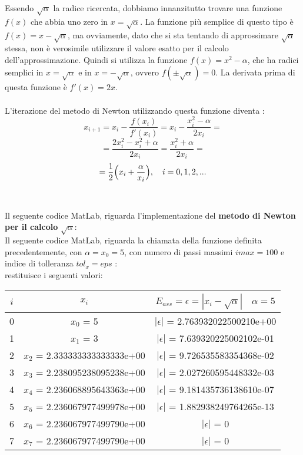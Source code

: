 Essendo $\sqrt{\alpha}$ la radice ricercata, dobbiamo innanzitutto trovare una funzione $f(x)$ che abbia uno zero in $x=\sqrt{\alpha}$. La funzione più semplice di questo tipo è $f(x)=x-\sqrt{\alpha}$, ma ovviamente, dato che si sta tentando di approssimare $\sqrt{\alpha}$ stessa, non è verosimile utilizzare il valore esatto per il calcolo dell'approssimazione. Quindi si
utilizza la funzione $f(x) = x^2-\alpha$, che ha radici semplici in $x=\sqrt{\alpha}$ e in $x=-\sqrt{\alpha}$, ovvero $f(\pm\sqrt{\alpha})=0$. La derivata prima di questa funzione è $f'(x)=2x$.\\\\
L'iterazione del metodo di Newton utilizzando questa funzione diventa :
\[
x_{i+1} = x_i-\frac{f(x_i)}{f'(x_i)} = x_i - \frac{x_i^2-\alpha}{2x_i} =
\]
\[
= \frac{2x_i^2-x_i^2+\alpha}{2x_i} = \frac{x_i^2+\alpha}{2x_i} =
\]
\[
= \frac{1}{2} \Bigl( x_i+\frac{\alpha}{x_i} \Bigl),\quad i=0,1,2,...
\]\\\\
Il seguente codice MatLab, riguarda l'implementazione del \textbf{metodo di Newton per il calcolo} $\sqrt{\alpha}$:\\ 

Il seguente codice MatLab, riguarda la chiamata della funzione definita precedentemente, con $\alpha=x_0=5$, con numero di passi massimi $imax=100$ e indice di tolleranza $tol_x=eps$ :\\

restituisce i seguenti valori:\\
\begin{center}
\begin{tabular}{|c|c|c|}
\hline
$i$ & $x_i$ & $E_{ass}=\epsilon=|x_i-\sqrt{\alpha}| \quad \alpha=5$ \\
\hline
    0 & $x_0$ = 5 & $|\epsilon|$ = 2.763932022500210e+00\\
    1 & $x_1$ = 3 & $|\epsilon|$ = 7.639320225002102e-01\\
    2 & $x_2$ = 2.333333333333333e+00 & $|\epsilon|$ = 9.726535583354368e-02\\
    3 & $x_3$ = 2.238095238095238e+00 & $|\epsilon|$ = 2.027260595448332e-03\\
    4 & $x_4$ = 2.236068895643363e+00 & $|\epsilon|$ = 9.181435736138610e-07\\
    5 & $x_5$ = 2.236067977499978e+00 & $|\epsilon|$ = 1.882938249764265e-13\\
    6 & $x_6$ = 2.236067977499790e+00 & $|\epsilon|$ = 0\\
    7 & $x_7$ = 2.236067977499790e+00 & $|\epsilon|$ = 0\\
\hline
\end{tabular}
\end{center}